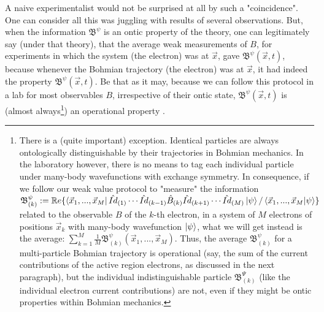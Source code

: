 \documentclass[11pt, a4paper]{article} %
\newcommand{\B}{\mathfrak{B}}
\begin{document}
A naive experimentalist would not be surprised at all by such a "coincidence". One can consider all this was juggling with results of several observations. But, when the information $\B^\psi$ is an ontic property of the theory, one can legitimately say (under that theory), that the average weak measurements of $B$, for experiments in which the system (the electron) was at $\vec{x}$, gave $\B^\psi(\vec{x},t)$, because whenever the Bohmian trajectory (the electron) was at $\vec{x}$, it had indeed the property $\B^\psi(\vec{x},t)$. Be that as it may, because we can follow this protocol in a lab for most observables $B$, irrespective of their ontic state, $\B^\psi(\vec{x},t)$ is (almost always\footnote{There is a (quite important) exception. Identical particles are always ontologically distinguishable by their trajectories in Bohmian mechanics. In the laboratory however, there is no means to tag each individual particle under many-body wavefunctions with exchange symmetry. In consequence, if we follow our weak value protocol to "measure" the information $\B_{(k)}^\psi:=\mathbb{R}e\{\bra{\vec{x}_1,...,\vec{x}_M}\hat{Id}_{(1)}\cdots\hat{Id}_{(k-1)}\hat{B}_{(k)}\hat{Id}_{(k+1)}\cdots\hat{Id}_{(M)}\ket{\psi}/\bra{\vec{x}_1,...,\vec{x}_M}\ket{\psi}\}$ related to the observable $B$ of the $k$-th electron, in a system of $M$ electrons of positions $\vec{x}_k$ with many-body wavefunction $\ket{\psi}$, what we will get instead is the average: $\sum_{k=1}^M \frac{1}{M}\B^\psi_{(k)}(\vec{x}_1,...,\vec{x}_M)$. Thus, the average $\B_{(k)}^\psi$ for a multi-particle Bohmian trajectory is operational (say, the sum of the current contributions of the active region electrons, as discussed in the next paragraph), but the individual indistinguishable particle $\B^\Psi_{(k)}$ (like the individual electron current contributions) are not, even if they might be ontic properties within Bohmian mechanics.}) an operational property \cite{DevInPosition1, DevInPosition2}.
\end{document}
